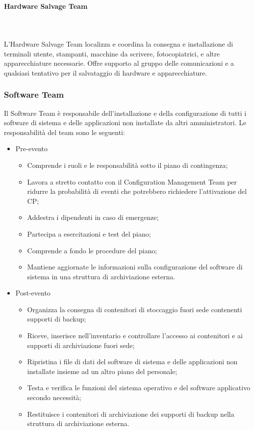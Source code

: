 \documentclass[12pt, a4paper, titlepage]{report}
\newcommand{\myparagraph}[1]{\paragraph{#1}\mbox{} \mbox{}}
\begin{document}
			\myparagraph{Hardware Salvage Team}\\ 
			\\L'Hardware Salvage Team localizza e coordina la consegna e installazione di terminali utente, stampanti, macchine da scrivere, fotocopiatrici, e altre apparecchiature necessarie. Offre supporto al gruppo delle comunicazioni e a qualsiasi tentativo per il salvataggio di hardware e apparecchiature.
			
			\subsubsection{Software Team}
			Il Software Team è responsabile dell'installazione e della configurazione di tutti i software di sistema e delle applicazioni non installate da altri amministratori. Le responsabilità del team sono le seguenti:
			\begin{itemize}
				\item Pre-evento
				\begin{itemize}
					\item Comprende i ruoli e le responsabilità sotto il piano di contingenza;
					\item Lavora a stretto contatto con il Configuration Management Team per ridurre la probabilità di eventi che potrebbero richiedere l'attivazione del CP;
					\item Addestra i dipendenti in caso di emergenze;
					\item Partecipa a esercitazioni e test del piano;
					\item Comprende a fondo le procedure del piano;
					\item Mantiene aggiornate le informazioni sulla configurazione del software di sistema in una struttura di archiviazione esterna.
				\end{itemize}
				\item Post-evento
				\begin{itemize}
					\item Organizza la consegna di contenitori di stoccaggio fuori sede contenenti supporti di backup;
					\item Riceve, inserisce nell'inventario e controllare l'accesso ai contenitori e ai supporti di archiviazione fuori sede;
					\item Ripristina i file di dati del software di sistema e delle applicazioni non installate insieme ad un altro piano del personale;
					\item Testa e verifica le funzioni del sistema operativo e del software applicativo secondo necessità;
					\item Restituisce i contenitori di archiviazione dei supporti di backup nella struttura di archiviazione esterna.
				\end{itemize}
			\end{itemize}
\end{document}
